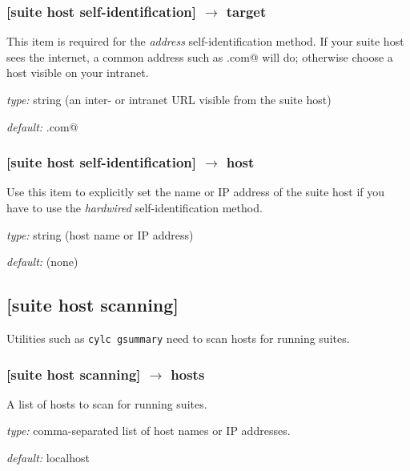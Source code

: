 \subsubsection[target]{[suite host self-identification] $\rightarrow$ target }

This item is required for the {\em address} self-identification method.
If your suite host sees the internet, a common address such as
\lstinline@google.com@ will do; otherwise choose a host visible on your
intranet.
\begin{myitemize}
\item {\em type:} string (an inter- or intranet URL visible from the suite host)
\item {\em default:} \lstinline@google.com@
\end{myitemize}


\subsubsection[host]{[suite host self-identification] $\rightarrow$ host }

Use this item to explicitly set the name or IP address of the suite host  
if you have to use the {\em hardwired} self-identification method.
\begin{myitemize}
\item {\em type:} string (host name or IP address)
\item {\em default:} (none)
\end{myitemize}

\subsection{[suite host scanning]}

Utilities such as \lstinline=cylc gsummary= need to scan hosts for
running suites.

\subsubsection[hosts]{[suite host scanning] $\rightarrow$ hosts }

A list of hosts to scan for running suites.
\begin{myitemize}
\item {\em type:} comma-separated list of host names or IP addresses.
\item {\em default:} localhost
\end{myitemize}

